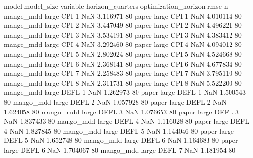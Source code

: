             model model_size variable  horizon_quarters optimization_horizon     rmse  n
        mango_mdd      large      CPI                 1                  NaN 3.116971 80
            paper      large      CPI                 1                  NaN 4.010114 80
        mango_mdd      large      CPI                 2                  NaN 3.447049 80
            paper      large      CPI                 2                  NaN 4.496221 80
        mango_mdd      large      CPI                 3                  NaN 3.534191 80
            paper      large      CPI                 3                  NaN 4.383412 80
        mango_mdd      large      CPI                 4                  NaN 3.292460 80
            paper      large      CPI                 4                  NaN 4.094012 80
        mango_mdd      large      CPI                 5                  NaN 2.802024 80
            paper      large      CPI                 5                  NaN 4.524668 80
        mango_mdd      large      CPI                 6                  NaN 2.368141 80
            paper      large      CPI                 6                  NaN 4.677834 80
        mango_mdd      large      CPI                 7                  NaN 2.258483 80
            paper      large      CPI                 7                  NaN 3.795110 80
        mango_mdd      large      CPI                 8                  NaN 2.311731 80
            paper      large      CPI                 8                  NaN 5.522200 80
        mango_mdd      large     DEFL                 1                  NaN 1.262973 80
            paper      large     DEFL                 1                  NaN 1.500543 80
        mango_mdd      large     DEFL                 2                  NaN 1.057928 80
            paper      large     DEFL                 2                  NaN 1.624058 80
        mango_mdd      large     DEFL                 3                  NaN 1.076653 80
            paper      large     DEFL                 3                  NaN 1.837433 80
        mango_mdd      large     DEFL                 4                  NaN 1.116028 80
            paper      large     DEFL                 4                  NaN 1.827845 80
        mango_mdd      large     DEFL                 5                  NaN 1.144046 80
            paper      large     DEFL                 5                  NaN 1.652748 80
        mango_mdd      large     DEFL                 6                  NaN 1.164683 80
            paper      large     DEFL                 6                  NaN 1.704067 80
        mango_mdd      large     DEFL                 7                  NaN 1.181954 80
